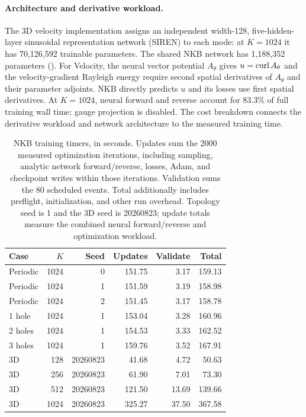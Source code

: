 \paragraph{Architecture and derivative workload.}
The 3D velocity implementation assigns an independent width-128, five-hidden-layer sinusoidal representation network (SIREN) {\citep{sitzmann2020implicit}} to each mode: at $K=1024$ it has 70,126,592 trainable parameters. The shared NKB network has 1,188,352 parameters (). For Velocity, the neural vector potential $A_\theta$ gives $u=\operatorname{curl} A_\theta$ and the velocity-gradient Rayleigh energy require second spatial derivatives of $A_\theta$ and their parameter adjoints. NKB directly predicts $u$ and its losses use first spatial derivatives. At $K=1024$, neural forward and reverse account for 83.3\% of full training wall time; gauge projection is disabled. The cost breakdown connects the derivative workload and network architecture to the measured training time.

\begin{table}[!htb]\centering\footnotesize\setlength{\tabcolsep}{4pt}
\caption{NKB training timers, in seconds. Updates sum the 2000 measured optimization iterations, including sampling, analytic network forward/reverse, losses, Adam, and checkpoint writes within those iterations. Validation sums the 80 scheduled events. Total additionally includes preflight, initialization, and other run overhead. Topology seed is 1 and the 3D seed is 20260823; update totals measure the combined neural forward/reverse and optimization workload.}
\label{tab:runtime-nkb-training}

\begin{tabular}{lrrrrr}\toprule
Case&$K$&Seed&Updates&Validate&Total\\\midrule
Periodic & 1024 & 0 & 151.75 & 3.17 & 159.13\\
Periodic & 1024 & 1 & 151.59 & 3.19 & 158.98\\
Periodic & 1024 & 2 & 151.45 & 3.17 & 158.78\\
1 hole & 1024 & 1 & 153.04 & 3.28 & 160.96\\
2 holes & 1024 & 1 & 154.53 & 3.33 & 162.52\\
3 holes & 1024 & 1 & 159.76 & 3.52 & 167.91\\
3D & 128 & 20260823 & 41.68 & 4.72 & 50.63\\
3D & 256 & 20260823 & 61.90 & 7.01 & 73.30\\
3D & 512 & 20260823 & 121.50 & 13.69 & 139.66\\
3D & 1024 & 20260823 & 325.27 & 37.50 & 367.58\\
\bottomrule\end{tabular}\end{table}


